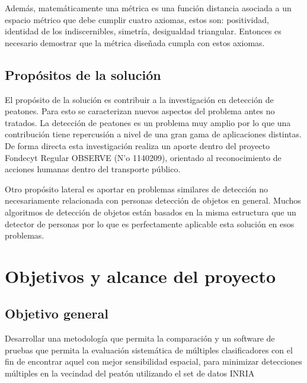 Además, matemáticamente una métrica es una función distancia asociada a un espacio métrico que debe cumplir cuatro axiomas, estos son: positividad, identidad de los indiscernibles, simetría, desigualdad triangular. Entonces es necesario demostrar que la métrica diseñada cumpla con estos axiomas. 

\subsection{Propósitos de la solución}

El propósito de la solución es contribuir a la investigación en detección de peatones. Para esto se caracterizan nuevos aspectos del problema antes no tratados. La detección de peatones es un problema muy amplio por lo que una contribución tiene repercusión a nivel de una gran gama de aplicaciones distintas. 
De forma directa esta investigación realiza un aporte dentro del proyecto Fondecyt Regular OBSERVE (N'o 1140209), orientado al reconocimiento de acciones humanas dentro del transporte público.

Otro propósito lateral es aportar en problemas similares de detección no necesariamente relacionada con personas \ie detección de objetos en general. Muchos algoritmos de detección de objetos están basados en la misma estructura que un detector de personas por lo que es perfectamente aplicable esta solución en esos problemas.

\section{Objetivos y alcance del proyecto}
\label{intro:objetivos}

\subsection{Objetivo general}

Desarrollar una metodología que permita la comparación y un software de pruebas que permita la evaluación sistemática de múltiples clasificadores con el fin de encontrar aquel con mejor sensibilidad espacial, para minimizar detecciones múltiples en la vecindad del peatón utilizando el set de datos INRIA


